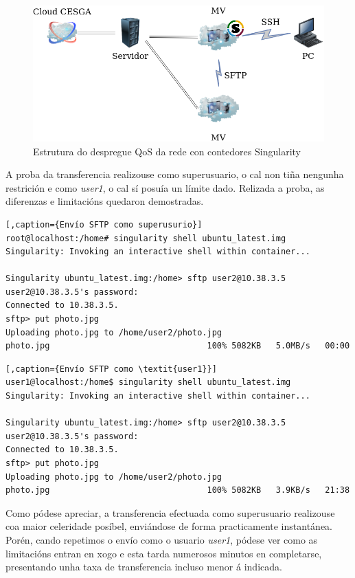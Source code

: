\begin{figure}
\centerline{\includegraphics[width=15cm]{figuras/DiagramaQoSRedeSingularity.png}}
\caption{Estrutura do despregue QoS da rede con contedores Singularity}
\label{DiagramaQoSRedeSingularity}
\end{figure}

A proba da transferencia realizouse como superusuario, o cal non tiña nengunha restrición e como \textit{user1}, o cal sí posuía un límite dado. Relizada a proba, as diferenzas e limitacións quedaron demostradas.

\begin{lstlisting}[,caption={Envío SFTP como superusurio}]
root@localhost:/home# singularity shell ubuntu_latest.img 
Singularity: Invoking an interactive shell within container...

Singularity ubuntu_latest.img:/home> sftp user2@10.38.3.5
user2@10.38.3.5's password: 
Connected to 10.38.3.5.
sftp> put photo.jpg 
Uploading photo.jpg to /home/user2/photo.jpg
photo.jpg                                100% 5082KB   5.0MB/s   00:00    
\end{lstlisting}

\begin{lstlisting}[,caption={Envío SFTP como \textit{user1}}]
user1@localhost:/home$ singularity shell ubuntu_latest.img
Singularity: Invoking an interactive shell within container...

Singularity ubuntu_latest.img:/home> sftp user2@10.38.3.5
user2@10.38.3.5's password: 
Connected to 10.38.3.5.
sftp> put photo.jpg 
Uploading photo.jpg to /home/user2/photo.jpg
photo.jpg                                100% 5082KB   3.9KB/s   21:38
\end{lstlisting}

Como pódese apreciar, a transferencia efectuada como superusuario realizouse coa maior celeridade posíbel, enviándose de forma practicamente instantánea. Porén, cando repetimos o envío como o usuario \textit{user1}, pódese ver como as limitacións entran en xogo e esta tarda numerosos minutos en completarse, presentando unha taxa de transferencia incluso menor á indicada.

